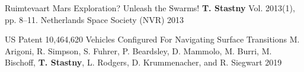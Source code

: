 \begin{cventries}
\begin{flushleft}
\end{flushleft}
	
\cvpubentry
	{Ruimtevaart} %
	{Mars Exploration? Unleash the Swarms!} %
	{\textbf{T. Stastny}} %
	{Vol. 2013(1), pp. 8--11. Netherlands Space Society (NVR)} %
	{2013} %
	{} %
	{} %
	

\begin{flushleft}
\end{flushleft}

\cvpubentry
	{US Patent 10,464,620} %
	{Vehicles Configured For Navigating Surface Transitions} %
	{M. Arigoni, R. Simpson, S. Fuhrer, P. Beardsley, D. Mammolo, M. Burri, M. Bischoff, \textbf{T. Stastny}, L. Rodgers, D. Krummenacher, and R. Siegwart} %
	{} %
	{2019} %
	{} %
	{} %

\end{cventries}
